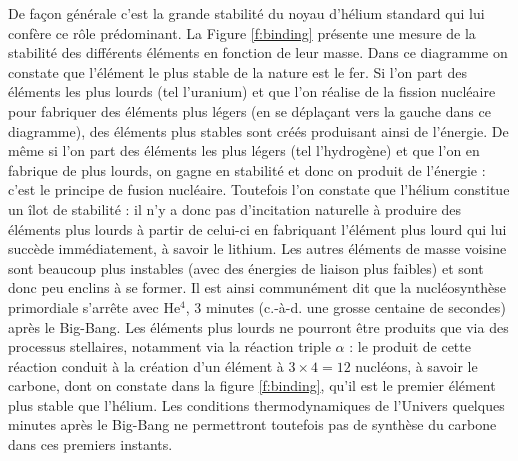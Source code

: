 De façon générale c'est la grande stabilité du noyau d'hélium standard qui lui confère ce rôle prédominant. La Figure \ref{f:binding} présente une mesure de la stabilité des différents éléments en fonction de leur masse. Dans ce diagramme on constate que l'élément le plus stable de la nature est le fer. Si l'on part des éléments les plus lourds (tel l'uranium) et que l'on réalise de la fission nucléaire pour fabriquer des éléments plus légers (en se déplaçant vers la gauche dans ce diagramme), des éléments plus stables sont créés produisant ainsi de l'énergie. De même si l'on part des éléments les plus légers (tel l'hydrogène) et que l'on en fabrique de plus lourds, on gagne en stabilité et donc on produit de l'énergie : c'est le principe de fusion nucléaire. Toutefois l'on constate que l'hélium constitue un îlot de stabilité : il n'y a donc pas d'incitation naturelle à produire des éléments plus lourds à partir de celui-ci en fabriquant l'élément plus lourd qui lui succède immédiatement, à savoir le lithium. Les autres éléments de masse voisine sont beaucoup plus instables (avec des énergies de liaison plus faibles) et sont donc peu enclins à se former. Il est ainsi communément dit que la nucléosynthèse primordiale s'arrête avec He$^4$, 3 minutes (c.-à-d. une grosse centaine de secondes) après le Big-Bang. Les éléments plus lourds ne pourront être produits que via des processus stellaires, notamment via la réaction triple $\alpha$ :  le produit de cette réaction conduit à la création d'un élément à $3\times 4= 12$ nucléons, à savoir le carbone, dont on constate dans la figure \ref{f:binding}, qu'il est le premier élément plus stable que l'hélium. Les conditions thermodynamiques de l'Univers quelques minutes après le Big-Bang ne permettront toutefois pas de synthèse du carbone dans ces premiers instants.

